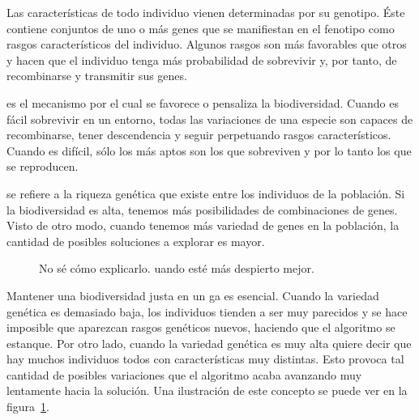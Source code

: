 Las características de todo individuo vienen determinadas por su genotipo. Éste contiene conjuntos de uno o más genes que se manifiestan en el fenotipo como rasgos característicos del individuo. Algunos rasgos son más favorables que otros y hacen que el individuo tenga más probabilidad de sobrevivir y, por tanto, de recombinarse y transmitir sus genes.

 es el mecanismo por el cual se favorece o pensaliza la biodiversidad. Cuando es fácil sobrevivir en un entorno, todas las variaciones de una especie son capaces de recombinarse, tener descendencia y seguir perpetuando rasgos característicos. Cuando es difícil, sólo los más aptos son los que sobreviven y por lo tanto los que se reproducen.

 se refiere a la riqueza genética que existe entre los individuos de la población. Si la biodiversidad es alta, tenemos más posibilidades de combinaciones de genes. Visto de otro modo, cuando tenemos más variedad de genes en la población, la cantidad de posibles soluciones a explorar es mayor.

\begin{figure}
	\caption{No sé cómo explicarlo. uando esté más despierto mejor.}
	\label{fig:different-levels-of-biodiversity}
\end{figure}

Mantener una biodiversidad justa en un \gls{ga} es esencial. Cuando la variedad genética es demasiado baja, los individuos tienden a ser muy parecidos y se hace imposible que aparezcan rasgos genéticos nuevos, haciendo que el algoritmo se estanque. Por otro lado, cuando la variedad genética es muy alta quiere decir que hay muchos individuos todos con características muy distintas. Esto provoca tal cantidad de posibles variaciones que el algoritmo acaba avanzando muy lentamente hacia la solución. Una ilustración de este concepto se puede ver en la figura~\ref{fig:different-levels-of-biodiversity}.

